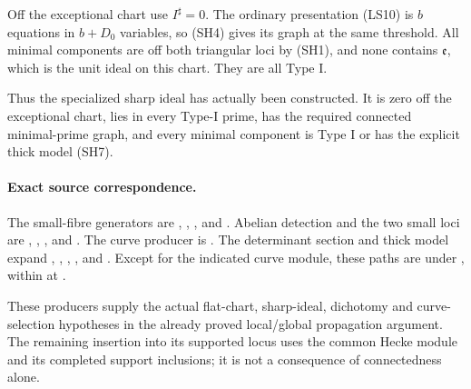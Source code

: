 Off the exceptional chart use
\(I^\sharp=0\).
The ordinary presentation (LS10)
is \(b\) equations in \(b+D_0\)
variables, so (SH4) gives its graph
at the same threshold.
All minimal components are off
both triangular loci by (SH1),
and none contains \(\mathfrak e\),
which is the unit ideal on this
chart.
They are all Type I.

Thus the specialized sharp ideal
has actually been constructed.
It is zero off the exceptional
chart, lies in every Type-I prime,
has the required connected
minimal-prime graph, and every
minimal component is Type I or
has the explicit thick model
(SH7).

\paragraph{Exact source correspondence.}
The small-fibre generators are
,
,
,
and .
Abelian detection and the two small
loci are
,
,
,
and
.
The curve producer is
.
The determinant section and thick model
expand ,
,
,
, and
.
Except for the indicated curve module,
these paths are under
, within
at .

These producers supply the actual
flat-chart, sharp-ideal, dichotomy
and curve-selection hypotheses in
the already proved local/global
propagation argument.
The remaining insertion into its
supported locus uses the common
Hecke module and its completed
support inclusions; it is not a
consequence of connectedness alone.
